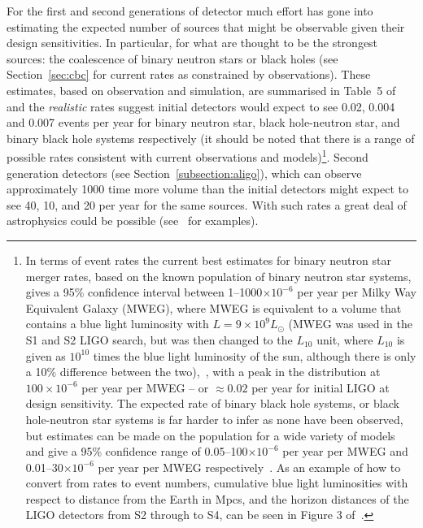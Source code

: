 \documentclass{article}
\begin{document}
For the first and second generations of detector much effort has gone into
estimating the expected number of sources that might be observable given their
design sensitivities. In particular, for what are thought to be the strongest
sources: the coalescence of binary neutron stars or black holes (see
Section~\ref{sec:cbc} for current rates as constrained by observations). These
estimates, based on observation and simulation, are summarised in Table~5 of
\cite{Abadie:2010e} and the \textit{realistic} rates suggest initial detectors
would expect to see 0.02, 0.004 and 0.007 events per year for binary neutron
star, black hole-neutron star, and binary black hole systems respectively (it
should be noted that there is a range of possible rates consistent with current
observations and models)\footnote{In terms of event rates the current best
estimates for binary neutron star merger rates, based on the known population of
binary neutron star systems, gives a 95\% confidence interval between
1--1000$\times10^{-6}$ per year per Milky Way Equivalent Galaxy (MWEG), where
MWEG is equivalent to a volume that contains a blue light luminosity with $L =
9\times10^9L_{\odot}$ (MWEG was used in the S1 and S2 LIGO search, but was then
changed to the $L_{10}$ unit, where $L_{10}$ is given as $10^{10}$ times the
blue light luminosity of the sun, although there is only a 10\% difference
between the two),~\cite{Abadie:2010e, Kalogera:2004a, Kalogera:2004b}, with a
peak in the distribution at $100\times10^{-6}$ per year per MWEG -- or $\approx
0.02$ per year for initial LIGO at design sensitivity. The expected rate of
binary black hole systems, or black hole-neutron star systems is far harder to
infer as none have been observed, but estimates can be made on the population
for a wide variety of models and give a 95\% confidence range of
0.05--100$\times10^{-6}$ per year per MWEG and 0.01--30$\times10^{-6}$ per year
per MWEG respectively~\cite{Abadie:2010e, OShaughnessy:2005, OShaughnessy:2008,
Abbott:2008a}. As an example of how to convert from rates to event numbers,
cumulative blue light luminosities with respect to distance from the Earth in
Mpcs, and the horizon distances of the LIGO detectors from S2 through to S4, can
be seen in Figure 3 of~\cite{Abbott:2008a}.}. Second generation detectors (see
Section~\ref{subsection:aligo}), which can observe approximately 1000 time more volume
than the initial detectors might expect to see 40, 10, and 20 per year for the
same sources. With such rates a great deal of astrophysics could be possible
(see~\cite{Sathyaprakash:2009} for examples).
\end{document}
